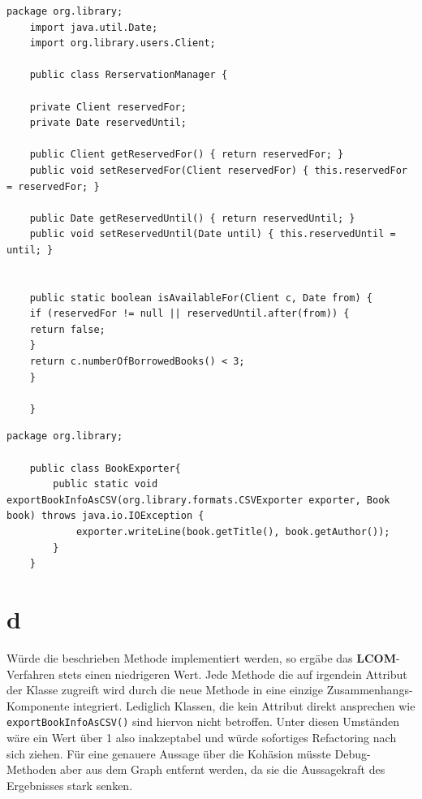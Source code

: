 \begin{lstlisting}[caption = {RerservationManager}]
	package org.library;
	import java.util.Date;
	import org.library.users.Client;
	
	public class RerservationManager {
	
	private Client reservedFor;
	private Date reservedUntil;   	
	
	public Client getReservedFor() { return reservedFor; }
	public void setReservedFor(Client reservedFor) { this.reservedFor = reservedFor; }
	
	public Date getReservedUntil() { return reservedUntil; }
	public void setReservedUntil(Date until) { this.reservedUntil = until; }
	
	
	public static boolean isAvailableFor(Client c, Date from) {
	if (reservedFor != null || reservedUntil.after(from)) {
	return false;
	}
	return c.numberOfBorrowedBooks() < 3;
	}
	
	}
\end{lstlisting}

\begin{lstlisting}[caption = BookExporter]
	package org.library;

	public class BookExporter{
		public static void exportBookInfoAsCSV(org.library.formats.CSVExporter exporter, Book book) throws java.io.IOException {        
			exporter.writeLine(book.getTitle(), book.getAuthor());        
		}   	
	}

\end{lstlisting}
\section*{d} 
Würde die beschrieben Methode implementiert werden, so ergäbe das \textbf{LCOM}-Verfahren stets einen niedrigeren Wert. Jede Methode die auf irgendein Attribut der Klasse zugreift wird durch die neue Methode in eine einzige Zusammenhangs-Komponente integriert.
Lediglich Klassen, die kein Attribut direkt ansprechen wie \texttt{exportBookInfoAsCSV()} sind hiervon nicht betroffen.
Unter diesen Umständen wäre ein Wert über 1 also inakzeptabel und würde sofortiges Refactoring nach sich ziehen. Für eine genauere Aussage über die Kohäsion müsste Debug-Methoden aber aus dem Graph entfernt werden, da sie die Aussagekraft des Ergebnisses stark senken. 


